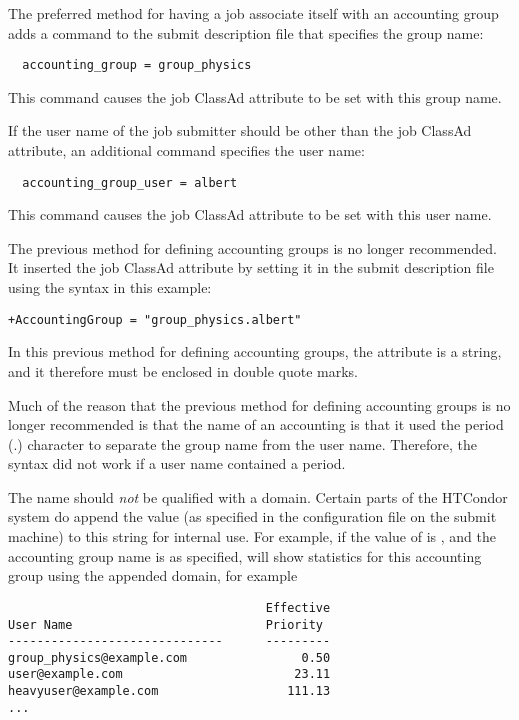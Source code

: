 The preferred method for having a job associate itself with
an accounting group adds a command to the submit description file
that specifies the group name:
\begin{verbatim}
  accounting_group = group_physics
\end{verbatim}
This command causes the job ClassAd attribute  to
be set with this group name.

If the user name of the job submitter should be other than the 
job ClassAd attribute, an additional command specifies the user name:
\begin{verbatim}
  accounting_group_user = albert
\end{verbatim}
This command causes the job ClassAd attribute  to
be set with this user name.

The previous method for defining accounting groups
is no longer recommended. 
It inserted the job ClassAd attribute 
by setting it in the submit description file using the syntax 
in this example:
\begin{verbatim}
+AccountingGroup = "group_physics.albert"
\end{verbatim}

In this previous method for defining accounting groups,
the  attribute is a string,
and it therefore must be enclosed in double quote marks.

Much of the reason that the previous method for defining accounting groups
is no longer recommended  is that the name of an accounting is that it
used the period (.) character to separate the group name from the
user name.  Therefore, the syntax did not work if a user name contained
a period.

The name should \emph{not} be qualified with a domain.
Certain parts of the HTCondor system 
do append the value 
(as specified in the configuration file on the submit machine)
to this string for internal use.
For example, if the value of  is
, and the accounting group name
is as specified,
 will show statistics
for this accounting group using the appended domain, for example
\footnotesize
\begin{verbatim}
                                    Effective
User Name                           Priority
------------------------------      ---------
group_physics@example.com                0.50
user@example.com                        23.11
heavyuser@example.com                  111.13
...
\end{verbatim}
\normalsize

